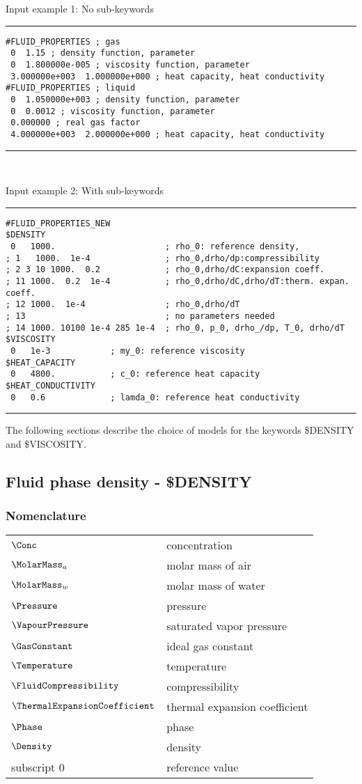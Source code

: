 \begin{minipage}{12cm}
Input example 1: No sub-keywords
\hrule
\begin{verbatim}
#FLUID_PROPERTIES ; gas
 0  1.15 ; density function, parameter
 0  1.800000e-005 ; viscosity function, parameter
 3.000000e+003  1.000000e+000 ; heat capacity, heat conductivity
#FLUID_PROPERTIES ; liquid
 0  1.050000e+003 ; density function, parameter
 0  0.0012 ; viscosity function, parameter
 0.000000 ; real gas factor
 4.000000e+003  2.000000e+000 ; heat capacity, heat conductivity
\end{verbatim}
\hrule
\end{minipage}
\\
\begin{minipage}{12cm}
Input example 2: With sub-keywords
\hrule
\begin{verbatim}
#FLUID_PROPERTIES_NEW
$DENSITY
 0   1000.                      ; rho_0: reference density,
; 1   1000.  1e-4               ; rho_0,drho/dp:compressibility
; 2 3 10 1000.  0.2             ; rho_0,drho/dC:expansion coeff.
; 11 1000.  0.2  1e-4           ; rho_0,drho/dC,drho/dT:therm. expan. coeff.
; 12 1000.  1e-4                ; rho_0,drho/dT
; 13                            ; no parameters needed
; 14 1000. 10100 1e-4 285 1e-4  ; rho_0, p_0, drho_/dp, T_0, drho/dT
$VISCOSITY
 0   1e-3            ; my_0: reference viscosity
$HEAT_CAPACITY
 0   4800.           ; c_0: reference heat capacity
$HEAT_CONDUCTIVITY
 0   0.6             ; lamda_0: reference heat conductivity
\end{verbatim}
\hrule
\end{minipage}

The following sections describe the choice of models for the
keywords \$DENSITY and \$VISCOSITY.

\subsection{Fluid phase density - \$DENSITY}

\subsubsection*{Nomenclature}
\begin{tabular}{ll}
$\Conc$ & concentration\\
$\MolarMass_a$ & molar mass of air\\
$\MolarMass_w$ & molar mass of water\\
$\Pressure$ & pressure\\
$\VapourPressure$ & saturated vapor pressure\\
$\GasConstant$ & ideal gas constant\\
$\Temperature$ & temperature\\
$\FluidCompressibility$ & compressibility\\
$\ThermalExpansionCoefficient$ & thermal expansion coefficient\\
$\Phase$ & phase\\
$\Density$ & density\\
subscript 0 &  reference value\\
\end{tabular}

